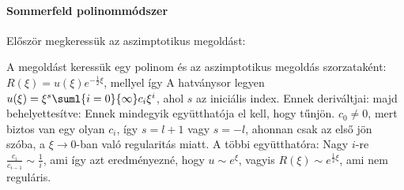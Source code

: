    \paragraph{Sommerfeld polinommódszer}
    
    Először megkeressük az aszimptotikus megoldást:
    
    A megoldást keressük egy polinom és az aszimptotikus megoldás szorzataként: $R(\xi)=u(\xi)e^{-\frac{1}{2}\xi}$, mellyel
    így
    A hatványsor legyen $u(\xi)=\xi^s\suml{i=0}{\infty}c_i\xi^i$, ahol $s$ az iniciális index.
   Ennek deriváltjai:
    majd behelyettesítve:
    Ennek mindegyik együtthatója el kell, hogy tűnjön. $c_0\ne 0$, mert biztos van egy olyan $c_i$, így $s=l+1$ vagy $s=-l$, ahonnan csak az első jön szóba, a $\xi\to 0$-ban való regularitás miatt.
   A többi együtthatóra:
    Nagy $i$-re $\frac{c_i}{c_{i-1}}\sim\frac{1}{i}$, ami így azt eredményezné, hogy $u\sim e^{\xi}$, vagyis $R(\xi)\sim e^{\frac{1}{2}\xi}$, ami nem reguláris.
